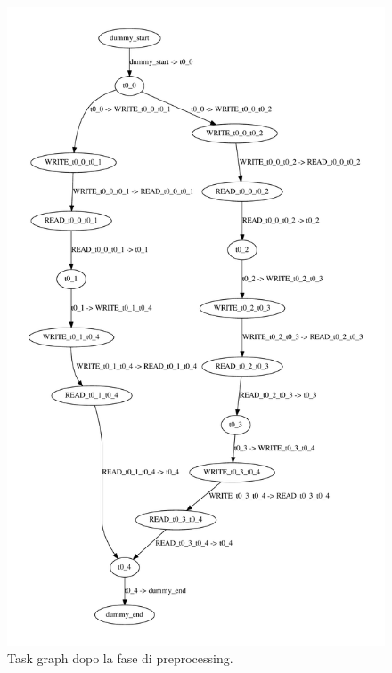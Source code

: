 \begin{figure}[t]
 \begin{center}
  \includegraphics[height=0.85\textheight]{./capitoli/figure/cap6/ProcessedTaskGraph.pdf}
  \caption{Task graph dopo la fase di preprocessing.}
  \label{fig:processedTG}
 \end{center}
\end{figure}


